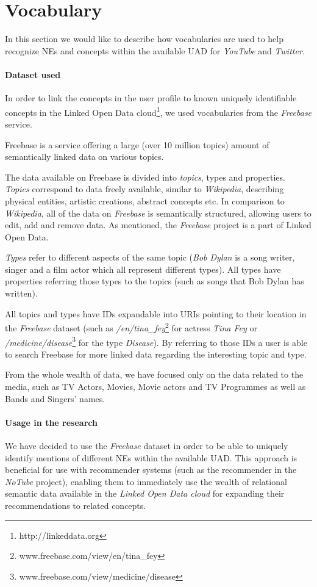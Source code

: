 \section{Vocabulary}
In this section we would like to describe how vocabularies are used to help recognize NEs and concepts within
the available UAD for \textit{YouTube} and \textit{Twitter}.

\paragraph{Dataset used}
In order to link the concepts in the user profile to known uniquely identifiable concepts in the Linked Open Data
cloud\footnote{http://linkeddata.org}, we used vocabularies from the \textit{Freebase} service.

Freebase is a service offering a large (over 10 million topics) amount of semantically linked data on various topics.

The data available on Freebase is divided into \textit{topics}, types and properties. \textit{Topics} correspond to data
freely available, similar to \textit{Wikipedia}, describing physical entities, artistic creations, abstract concepts
etc. In comparison to \textit{Wikipedia}, all of the data on \textit{Freebase} is semantically structured,
allowing users to edit, add and remove data. As mentioned, the \textit{Freebase} project is a part of Linked Open Data.

\textit{Types} refer to different aspects of the same topic (\eg \textit{Bob Dylan} is a song writer,
singer and a film actor which all represent different types). All types have properties referring those
types to the topics (such as songs that Bob Dylan has written).

All topics and types have IDs expandable into URIs pointing to their location in the \textit{Freebase} dataset
(such as \textit{/en/tina\_fey}\footnote{www.freebase.com/view/en/tina\_fey} for actress \textit{Tina Fey}
or \textit{/medicine/disease}\footnote{www.freebase.com/view/medicine/disease} for the type \textit{Disease}).
By referring to those IDs a user is able to search Freebase for more linked data regarding the interesting topic and type.

From the whole wealth of data, we have focused only on the data related to the media, such as TV Actors, Movies, Movie
actors and TV Programmes as well as Bands and Singers' names.

\paragraph{Usage in the research}
We have decided to use the \textit{Freebase} dataset in order to be able to uniquely identify mentions of different NEs
within the available UAD. This approach is beneficial for use with recommender systems (such as the recommender
in the \textit{NoTube} project), enabling them to immediately use the wealth of relational semantic data available
in the \textit{Linked Open Data cloud} for expanding their recommendations to related concepts.
